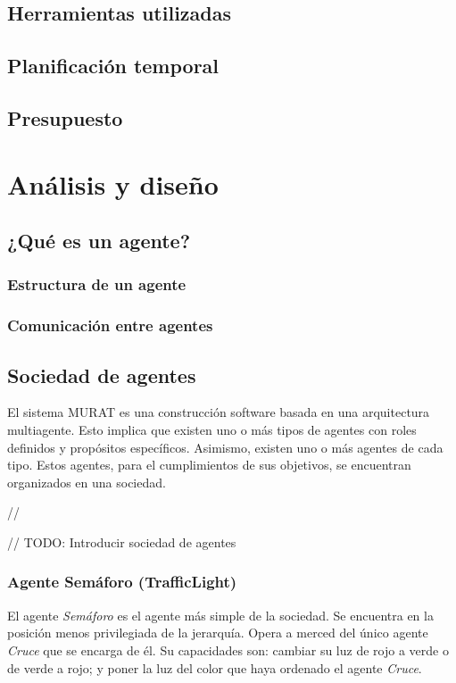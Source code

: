 \section{Herramientas utilizadas}
\section{Planificación temporal}
\section{Presupuesto}

\chapter{Análisis y diseño}
\section{¿Qué es un agente?}
\subsection{Estructura de un agente}
\subsection{Comunicación entre agentes}

\newpage
\section{Sociedad de agentes}
El sistema MURAT es una construcción software basada en una arquitectura multiagente. Esto implica que existen uno o más tipos de agentes con roles definidos y propósitos específicos. Asimismo, existen uno o más agentes de cada tipo. Estos agentes, para el cumplimientos de sus objetivos, se encuentran organizados en una sociedad.

//

// TODO: Introducir sociedad de agentes

\subsection{Agente Semáforo (TrafficLight)}
El agente \textit{Semáforo} es el agente más simple de la sociedad. Se encuentra en la posición menos privilegiada de la jerarquía. Opera a merced del único agente \textit{Cruce} que se encarga de él. Su capacidades son: cambiar su luz de rojo a verde o de verde a rojo; y poner la luz del color que haya ordenado el agente \textit{Cruce}. 

